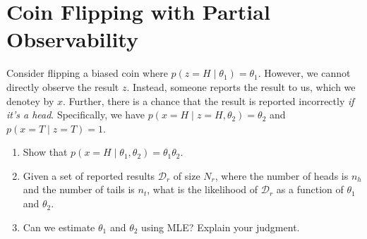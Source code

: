 \documentclass{article}
\theoremstyle{plain}
\theoremstyle{definition}
\begin{document}
\section{Coin Flipping with Partial Observability}
Consider flipping a biased coin where $p(z=H\mid \theta_1) = \theta_1$.
However, we cannot directly observe the result $z$.
Instead, someone reports the result to us,
which we denotey by $x$.
Further, there is a chance that the result is reported incorrectly \emph{if it's a head}.
Specifically, we have $p(x=H\mid z=H, \theta_2) = \theta_2$
and $p(x=T\mid z=T) = 1$.

\begin{enumerate}
  \setcounter{enumi}{\value{saveenum}}
\item Show that $p(x=H\mid \theta_1, \theta_2) = \theta_1 \theta_2$.


\item Given a set of reported results $\mathcal{D}_r$ of size $N_r$, where the number of heads is $n_h$ and the number of tails is $n_t$, what is the likelihood of $\mathcal{D}_r$ as a function of $\theta_1$ and $\theta_2$.


\item Can we estimate $\theta_1$ and $\theta_2$ using MLE? Explain your judgment.


\setcounter{saveenum}{\value{enumi}}
\end{enumerate}
\end{document}

